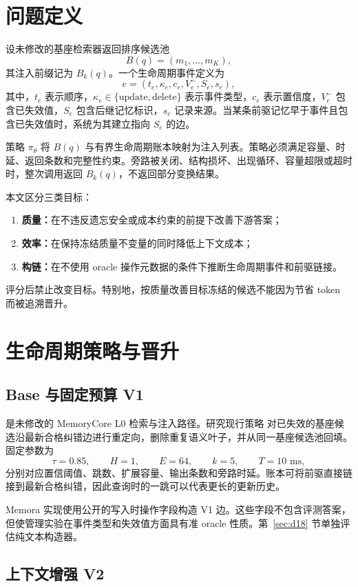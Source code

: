 \section{问题定义}

设未修改的基座检索器返回排序候选池
\[
B(q)=(m_1,\ldots,m_K),
\]
其注入前缀记为 $B_k(q)$。一个生命周期事件定义为
\[
e=(t_e,\kappa_e,c_e,V_e^{-},S_e,s_e),
\]
其中，$t_e$ 表示顺序，$\kappa_e\in\{\text{update},\text{delete}\}$ 表示事件类型，$c_e$ 表示置信度，$V_e^{-}$ 包含已失效值，$S_e$ 包含后继记忆标识，$s_e$ 记录来源。当某条前驱记忆早于事件且包含已失效值时，系统为其建立指向 $S_e$ 的边。

策略 $\pi_\theta$ 将 $B(q)$ 与有界生命周期账本映射为注入列表。策略必须满足容量、时延、返回条数和完整性约束。旁路被关闭、结构损坏、出现循环、容量超限或超时时，整次调用返回 $B_k(q)$，不返回部分变换结果。

本文区分三类目标：
\begin{enumerate}
  \item \textbf{质量：}在不违反遗忘安全或成本约束的前提下改善下游答案；
  \item \textbf{效率：}在保持冻结质量不变量的同时降低上下文成本；
  \item \textbf{构链：}在不使用 oracle 操作元数据的条件下推断生命周期事件和前驱链接。
\end{enumerate}
评分后禁止改变目标。特别地，按质量改善目标冻结的候选不能因为节省 token 而被追溯晋升。

\section{生命周期策略与晋升}

\subsection{Base 与固定预算 V1}

\base 是未修改的 MemoryCore L0 检索与注入路径。研究现行策略 \vone 对已失效的基座候选沿最新合格纠错边进行重定向，删除重复语义叶子，并从同一基座候选池回填。固定参数为
\[
\tau=0.85,\qquad H=1,\qquad E=64,\qquad k=5,\qquad T=10\text{ ms},
\]
分别对应置信阈值、跳数、扩展容量、输出条数和旁路时延。账本可将前驱直接链接到最新合格纠错，因此查询时的一跳可以代表更长的更新历史。

Memora 实现使用公开的写入时操作字段构造 V1 边。这些字段不包含评测答案，但使管理实验在事件类型和失效值方面具有准 oracle 性质。第~\ref{sec:d18} 节单独评估纯文本构造器。

\subsection{上下文增强 V2}

